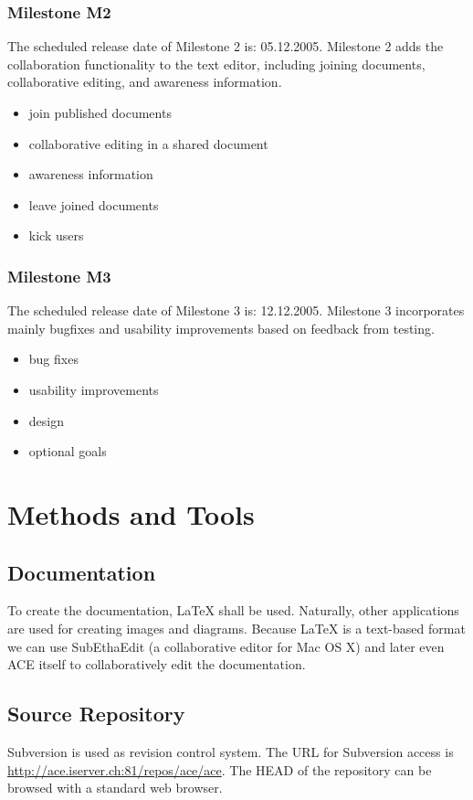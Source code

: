 \documentclass[11pt,a4paper]{article}
\begin{document}
\subsubsection{Milestone M2}

The scheduled release date of Milestone 2 is: 05.12.2005. Milestone 2 adds the collaboration functionality
to the text editor, including joining documents, collaborative editing, and awareness information.

\begin{itemize}
 \item join published documents
 \item collaborative editing in a shared document
 \item awareness information
 \item leave joined documents
 \item kick users
\end{itemize}

\subsubsection{Milestone M3}

The scheduled release date of Milestone 3 is: 12.12.2005. Milestone 3 incorporates mainly bugfixes and
usability improvements based on feedback from testing.

\begin{itemize}
 \item bug fixes
 \item usability improvements
 \item design
 \item optional goals
\end{itemize}


\section{Methods and Tools}

\subsection{Documentation}
To create the documentation, \LaTeX{} shall be used. Naturally, other applications are used for creating images and diagrams.
Because \LaTeX{} is a text-based format we can use SubEthaEdit (a collaborative editor for Mac OS X) and later even
ACE itself to collaboratively edit the documentation. 

\subsection{Source Repository}
Subversion is used as revision control system. The URL for Subversion access is
\href{http://ace.iserver.ch:81/repos/ace/ace}{http://ace.iserver.ch:81/repos/ace/ace}. The HEAD of the repository can
be browsed with a standard web browser.
\end{document}
